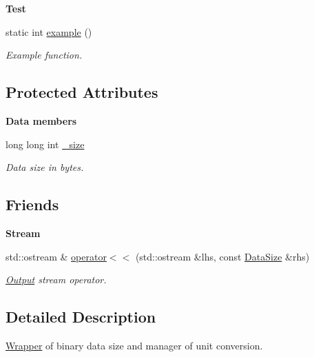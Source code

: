 \begin{Indent}{\bf Test}\par
\begin{DoxyCompactItemize}
\item 
static int \hyperlink{exceptionmagrathea_1_1DataSize_a228321b9767ce487d2635090972616b6}{example} ()
\begin{DoxyCompactList}\small\item\em Example function. \end{DoxyCompactList}\end{DoxyCompactItemize}
\end{Indent}
\subsection*{Protected Attributes}
\begin{Indent}{\bf Data members}\par
\begin{DoxyCompactItemize}
\item 
long long int \hyperlink{exceptionmagrathea_1_1DataSize_afa83372be705d488fcf02d5102d46c9f}{\-\_\-size}
\begin{DoxyCompactList}\small\item\em Data size in bytes. \end{DoxyCompactList}\end{DoxyCompactItemize}
\end{Indent}
\subsection*{Friends}
\begin{Indent}{\bf Stream}\par
\begin{DoxyCompactItemize}
\item 
std\-::ostream \& \hyperlink{exceptionmagrathea_1_1DataSize_a8e194016cf87d9a96ba494a79f947a07}{operator$<$$<$} (std\-::ostream \&lhs, const \hyperlink{exceptionmagrathea_1_1DataSize}{Data\-Size} \&rhs)
\begin{DoxyCompactList}\small\item\em \hyperlink{exceptionOutput}{Output} stream operator. \end{DoxyCompactList}\end{DoxyCompactItemize}
\end{Indent}


\subsection{Detailed Description}
\hyperlink{exceptionmagrathea_1_1Wrapper}{Wrapper} of binary data size and manager of unit conversion. 

